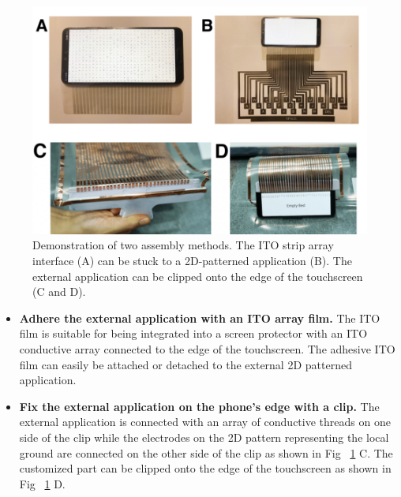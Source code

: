 \begin{figure}[ht]
    \centering
      \includegraphics[width=0.75\columnwidth]{figures/plugandplay.png}
      \setlength{\belowcaptionskip}{-6pt}
      \caption{Demonstration of two assembly methods. The ITO strip array interface (A) can be stuck to a 2D-patterned application (B). The external application can be clipped onto the edge of the touchscreen (C and D).}
      \label{fig:plugandplay}
\end{figure}

\begin{itemize}
    \item \textbf{Adhere the external application with an ITO array film.} The ITO film is suitable for being integrated into a screen protector with an ITO conductive array connected to the edge of the touchscreen. The adhesive ITO film can easily be attached or detached to the external 2D patterned application. 
    \item \textbf{Fix the external application on the phone's edge with a clip.} The external application is connected with an array of conductive threads on one side of the clip while the electrodes on the 2D pattern representing the local ground are connected on the other side of the clip as shown in Fig ~\ref{fig:plugandplay} C. The customized part can be clipped onto the edge of the touchscreen as shown in Fig ~\ref{fig:plugandplay} D. 
\end{itemize}




